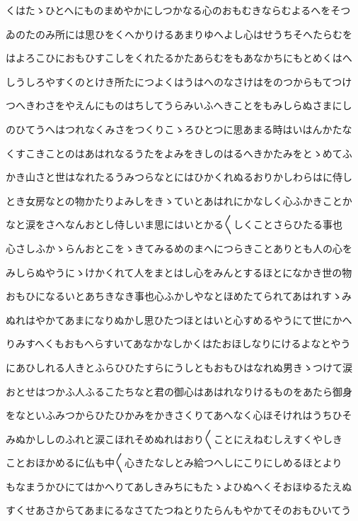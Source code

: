 \documentclass[a4paper,11pt,landscape]{ltjtarticle}
\begin{document}
くはたゝひとへにものまめやかにしつかなる心のおもむきならむよるへをそつ
\par\medskip
ゐのたのみ所には思ひをくへかりけるあまりゆへよし心はせうちそへたらむを
\par\medskip
はよろこひにおもひすこしをくれたるかたあらむをもあなかちにもとめくはへ
\par\medskip
しうしろやすくのとけき所たにつよくはうはへのなさけはをのつからもてつけ
\par\medskip
つへきわさをやえんにものはちしてうらみいふへきことをもみしらぬさまにし
\par\medskip
のひてうへはつれなくみさをつくりこゝろひとつに思あまる時はいはんかたな
\par\medskip
くすこきことのはあはれなるうたをよみをきしのはるへきかたみをとゝめてふ
\par\medskip
かき山さと世はなれたるうみつらなとにはひかくれぬるおりかしわらはに侍し
\par\medskip
とき女房なとの物かたりよみしをきゝていとあはれにかなしく心ふかきことか
\par\medskip
なと涙をさへなんおとし侍しいま思にはいとかる〱しくことさらひたる事也
\par\medskip
心さしふかゝらんおとこをゝきてみるめのまへにつらきことありとも人の心を
\par\medskip
みしらぬやうにゝけかくれて人をまとはし心をみんとするほとになかき世の物
\par\medskip
おもひになるいとあちきなき事也心ふかしやなとほめたてられてあはれすゝみ
\par\medskip
ぬれはやかてあまになりぬかし思ひたつほとはいと心すめるやうにて世にかへ
\par\medskip
りみすへくもおもへらすいてあなかなしかくはたおほしなりにけるよなとやう
\par\medskip
にあひしれる人きとふらひひたすらにうしともおもひはなれぬ男きゝつけて涙
\par\medskip
おとせはつかふ人ふるこたちなと君の御心はあはれなりけるものをあたら御身
\par\medskip
をなといふみつからひたひかみをかきさくりてあへなく心ほそけれはうちひそ
\par\medskip
みぬかししのふれと涙こほれそめぬれはおり〱ことにえねむしえすくやしき
\par\medskip
ことおほかめるに仏も中〱心きたなしとみ給つへしにこりにしめるほとより
\par\medskip
もなまうかひにてはかへりてあしきみちにもたゝよひぬへくそおほゆるたえぬ
\par\medskip
すくせあさからてあまにるなさてたつねとりたらんもやかてそのおもひいてう
\end{document}
